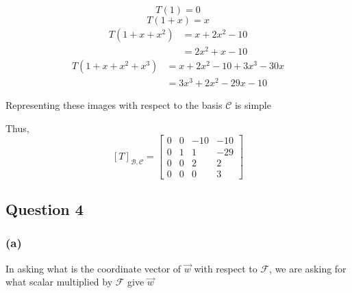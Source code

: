 \documentclass{article}
\begin{document}
\[
T(1) = 0
\]
\[
T(1+x) = x
\]
\begin{align*}
    T(1+x+x^2) &= x + 2x^2 -10 \\
    &= 2x^2 + x -10
\end{align*}
\begin{align*}
    T(1+x+x^2+x^3) &= x + 2x^2 - 10 + 3x^3-30 x \\
    &= 3x^3 + 2x^2 -29x -10
\end{align*}

Representing these images with respect to the basis \(\mathcal{C}\) is simple

Thus,
\[
[T]_{\mathcal{B}, \mathcal{C}} = \begin{bmatrix}
    0 & 0 & -10 & -10 \\
    0 & 1 & 1 & -29 \\
    0 & 0 & 2 & 2 \\
    0 & 0 & 0 & 3
\end{bmatrix}
\]


\subsection*{Question 4}
\subsubsection*{(a)}
In asking what is the coordinate vector of \(\vec{w}\) with respect to \(\mathcal{F}\), we are 
asking for what scalar multiplied by \(\mathcal{F}\) give \(\vec{w}\)
\end{document}
